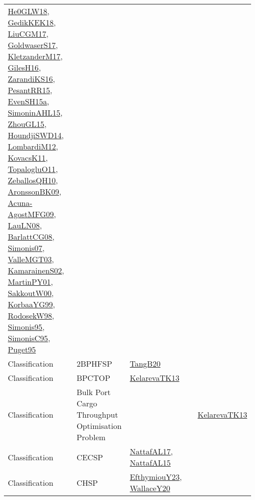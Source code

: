{\begin{longtable}{lp{3cm}>{\raggedright}p{6cm}>{\raggedright}p{6cm}p{8cm}}
\href{papers/He0GLW18.pdf}{He0GLW18}\cite{He0GLW18}, \href{articles/GedikKEK18.pdf}{GedikKEK18}\cite{GedikKEK18}, \href{papers/LiuCGM17.pdf}{LiuCGM17}\cite{LiuCGM17}, \href{papers/GoldwaserS17.pdf}{GoldwaserS17}\cite{GoldwaserS17}, \href{papers/KletzanderM17.pdf}{KletzanderM17}\cite{KletzanderM17}, \href{papers/GilesH16.pdf}{GilesH16}\cite{GilesH16}, \href{articles/ZarandiKS16.pdf}{ZarandiKS16}\cite{ZarandiKS16}, \href{papers/PesantRR15.pdf}{PesantRR15}\cite{PesantRR15}, \href{articles/EvenSH15a.pdf}{EvenSH15a}\cite{EvenSH15a}, \href{articles/SimoninAHL15.pdf}{SimoninAHL15}\cite{SimoninAHL15}, \href{papers/ZhouGL15.pdf}{ZhouGL15}\cite{ZhouGL15}, \href{papers/HoundjiSWD14.pdf}{HoundjiSWD14}\cite{HoundjiSWD14}, \href{articles/LombardiM12.pdf}{LombardiM12}\cite{LombardiM12}, \href{articles/KovacsK11.pdf}{KovacsK11}\cite{KovacsK11}, \href{articles/TopalogluO11.pdf}{TopalogluO11}\cite{TopalogluO11}, \href{articles/ZeballosQH10.pdf}{ZeballosQH10}\cite{ZeballosQH10}, \href{papers/AronssonBK09.pdf}{AronssonBK09}\cite{AronssonBK09}, \href{papers/Acuna-AgostMFG09.pdf}{Acuna-AgostMFG09}\cite{Acuna-AgostMFG09}, \href{papers/LauLN08.pdf}{LauLN08}\cite{LauLN08}, \href{papers/BarlattCG08.pdf}{BarlattCG08}\cite{BarlattCG08}, \href{articles/Simonis07.pdf}{Simonis07}\cite{Simonis07}, \href{papers/ValleMGT03.pdf}{ValleMGT03}\cite{ValleMGT03}, \href{papers/KamarainenS02.pdf}{KamarainenS02}\cite{KamarainenS02}, \href{articles/MartinPY01.pdf}{MartinPY01}\cite{MartinPY01}, \href{articles/SakkoutW00.pdf}{SakkoutW00}\cite{SakkoutW00}, \href{papers/KorbaaYG99.pdf}{KorbaaYG99}\cite{KorbaaYG99}, \href{papers/RodosekW98.pdf}{RodosekW98}\cite{RodosekW98}, \href{papers/Simonis95.pdf}{Simonis95}\cite{Simonis95}, \href{papers/SimonisC95.pdf}{SimonisC95}\cite{SimonisC95}, \href{papers/Puget95.pdf}{Puget95}\cite{Puget95}\\
Classification & 2BPHFSP & \href{papers/TangB20.pdf}{TangB20}\cite{TangB20} &  & \\
Classification & BPCTOP & \href{papers/KelarevaTK13.pdf}{KelarevaTK13}\cite{KelarevaTK13} &  & \\
Classification & Bulk Port Cargo Throughput Optimisation Problem &  &  & \href{papers/KelarevaTK13.pdf}{KelarevaTK13}\cite{KelarevaTK13}\\
Classification & CECSP & \href{articles/NattafAL17.pdf}{NattafAL17}\cite{NattafAL17}, \href{articles/NattafAL15.pdf}{NattafAL15}\cite{NattafAL15} &  & \\
Classification & CHSP & \href{papers/EfthymiouY23.pdf}{EfthymiouY23}\cite{EfthymiouY23}, \href{articles/WallaceY20.pdf}{WallaceY20}\cite{WallaceY20} &  & \\

\end{longtable}}
